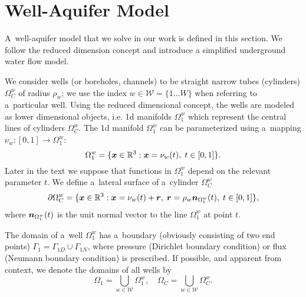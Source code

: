 \newpage
\section{Well-Aquifer Model}
A~well-aquifer model that we solve in our work is defined in this section.
We follow the reduced dimension concept and introduce a simplified underground water flow model.

We consider wells (or boreholes, channels) to be straight narrow tubes (cylinders) $\Omega^w_C$ of radius $\rho_w$;
we use the index $w\in\mathcal{W}=\{1\ldots W\}$ when referring to a~particular well.
Using the reduced dimensional concept, the wells are modeled as lower dimensional objects,
i.e. 1d manifolds $\Omega^w_1$ which represent the central lines of cylinders $\Omega^w_C$.
The 1d manifold $\Omega^w_1$ can be parameterized using a~mapping $\nu_w: [0,1] \rightarrow \Omega^w_1$:
\begin{equation} \label{eqn:1d_parametrization}
    \Omega^w_1 = \{\vc x\in\R^3: \vc x = \nu_w(t),\; t\in[0,1] \}. %
\end{equation}
Later in the text we suppose that functions in $\Omega^w_1$ depend on the relevant parameter $t$.
We define a~lateral surface of a~cylinder $\Omega^w_C$
\begin{equation}
    \partial\Omega^w_C = \{\mathbf{\boldsymbol{x}}\in\mathbb{R}^3: \mathbf{\boldsymbol{x}} = \nu_w(t) + \mathbf{\boldsymbol{r}},\; \mathbf{\boldsymbol{r}}=\rho_w\mathbf{\boldsymbol{n}}_{\Omega^w_1}(t),\; t\in[0,1] \},
\end{equation}
where $\mathbf{\boldsymbol{n}}_{\Omega^w_1}(t)$ is the unit normal vector to the line $\Omega^w_1$ at point $t$.

The domain of a~well $\Omega^w_1$ has a~boundary (obviously consisting of two end points)
$\Gamma_1 = \Gamma_{1D} \cup \Gamma_{1N}$, where pressure (Dirichlet boundary condition)
or flux (Neumann boundary condition) is prescribed.
If possible, and apparent from context, we denote the domains of all wells by
\begin{equation}
    \Omega_1 = \bigcup_{w\in\mathcal{W}} \Omega^w_1, \quad \Omega_C = \bigcup_{w\in\mathcal{W}} \Omega^w_C.
\end{equation}


